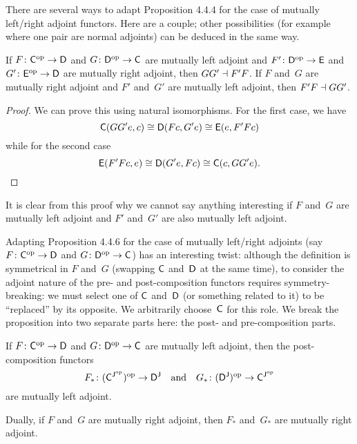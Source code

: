 \documentclass[../../solutions]{subfiles}
\begin{document}
There are several ways to adapt Proposition 4.4.4 for the case of
mutually left/right adjoint functors.  Here are a couple; other
possibilities (for example where one pair are normal adjoints) can be
deduced in the same way.

\begingroup
\renewcommand{\theHtheorem}{\theHsection.\arabic{theorem}.mutual}
\begin{proposition}
  If ${F}\colon{{\mathsf{C}}^{\mathrm{op}}}\to{{\mathsf{D}}}$ and ${G}\colon{{\mathsf{D}}^{\mathrm{op}}}\to{{\mathsf{C}}}$ are
  mutually left adjoint and ${F'}\colon{{\mathsf{D}}^{\mathrm{op}}}\to{{\mathsf{E}}}$ and
  ${G'}\colon{{\mathsf{E}}^{\mathrm{op}}}\to{{\mathsf{D}}}$ are mutually right adjoint, then $GG'\dashv
  F'F$.  If $F$ and~$G$ are mutually right adjoint and $F'$ and~$G'$
  are mutually left adjoint, then $F'F\dashv GG'$.
\end{proposition}
\popthm
\endgroup

\begin{proof}[Proof]
  We can prove this using natural isomorphisms.  For the first case,
  we have
  $${\mathsf{C}}(GG'e,c)\cong {\mathsf{D}}(Fc,G'e) \cong {\mathsf{E}}(e,F'Fc)$$
  while for the second case
  \[{\mathsf{E}}(F'Fc,e)\cong {\mathsf{D}}(G'e,Fc) \cong {\mathsf{C}}(c,GG'e).\qedhere\]
\end{proof}

It is clear from this proof why we cannot say anything interesting if
$F$ and~$G$ are mutually left adjoint and $F'$ and~$G'$ are also
mutually left adjoint.

\bigskip

Adapting Proposition 4.4.6 for the case of mutually left/right
adjoints (say ${F}\colon{{\mathsf{C}}^{\mathrm{op}}}\to{{\mathsf{D}}}$ and ${G}\colon{{\mathsf{D}}^{\mathrm{op}}}\to{{\mathsf{C}}}$)
has an interesting twist: although the definition is symmetrical in
$F$ and~$G$ (swapping ${\mathsf{C}}$ and~${\mathsf{D}}$ at the same time), to consider
the adjoint nature of the pre- and post-composition functors requires
symmetry-breaking: we must select one of ${\mathsf{C}}$ and~${\mathsf{D}}$ (or something
related to it) to be ``replaced'' by its opposite.  We arbitrarily
choose~${\mathsf{C}}$ for this role.  We break the proposition into two
separate parts here: the post- and pre-composition parts.

\begingroup
\renewcommand{\theHtheorem}{\theHsection.\arabic{theorem}.mutual.post}
\begin{proposition}
  \label{prop:4.4.6.mutual.post}
  If ${F}\colon{{\mathsf{C}}^{\mathrm{op}}}\to{{\mathsf{D}}}$ and ${G}\colon{{\mathsf{D}}^{\mathrm{op}}}\to{{\mathsf{C}}}$ are
  mutually left adjoint, then the post-composition functors
  $${F_*}\colon{({\mathsf{C}}^{{\mathsf{J}}^{\mathrm{op}}})^{\mathrm{op}}}\to{{\mathsf{D}}^{\mathsf{J}}} \quad \text{and} \quad
  {G_*}\colon{({\mathsf{D}}^{\mathsf{J}})^{\mathrm{op}}}\to{{\mathsf{C}}^{{\mathsf{J}}^{\mathrm{op}}}}$$
  are mutually left adjoint.

  Dually, if $F$ and~$G$ are mutually right adjoint, then $F_*$
  and~$G_*$ are mutually right adjoint.
\end{proposition}
\popthm
\endgroup
\end{document}
